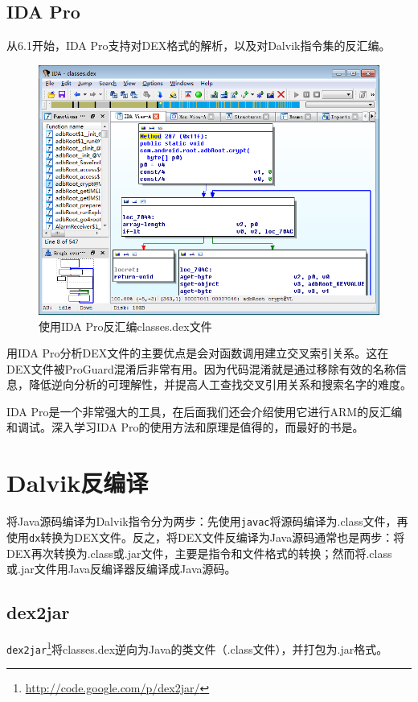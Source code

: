 \subsection{IDA Pro}
从6.1开始，IDA Pro支持对DEX格式的解析，以及对Dalvik指令集的反汇编。

\begin{figure}[htbp]
  \centering
  \includegraphics[width=14cm]{image/ida-dex.png}
  \caption{使用IDA Pro反汇编classes.dex文件}
  \label{Fig:ida-dex}
\end{figure}

用IDA Pro分析DEX文件的主要优点是会对函数调用建立交叉索引关系。这在DEX文件被ProGuard混淆后非常有用。因为代码混淆就是通过移除有效的名称信息，降低逆向分析的可理解性，并提高人工查找交叉引用关系和搜索名字的难度。

IDA Pro是一个非常强大的工具，在后面我们还会介绍使用它进行ARM的反汇编和调试。深入学习IDA Pro的使用方法和原理是值得的，而最好的书是\cite{ida_pro}。

\section{Dalvik反编译}
将Java源码编译为Dalvik指令分为两步：先使用\lstinline!javac!将源码编译为.class文件，再使用\lstinline!dx!转换为DEX文件。反之，将DEX文件反编译为Java源码通常也是两步：将DEX再次转换为.class或.jar文件，主要是指令和文件格式的转换；然而将.class或.jar文件用Java反编译器反编译成Java源码。

\subsection{dex2jar}
\lstinline!dex2jar!\footnote{\url{http://code.google.com/p/dex2jar/}}将classes.dex逆向为Java的类文件（.class文件），并打包为.jar格式。

